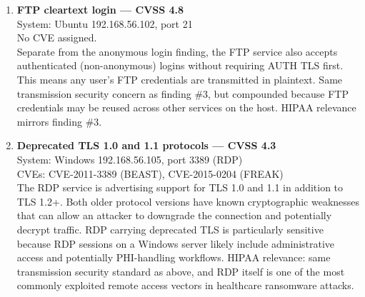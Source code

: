 \documentclass[12pt]{article}
\begin{document}
\begin{enumerate}
	\item \textbf{FTP cleartext login — CVSS 4.8}\\
		System: Ubuntu 192.168.56.102, port 21\\
		No CVE assigned.\\
		Separate from the anonymous login finding, the FTP service also accepts authenticated (non-anonymous) logins without requiring AUTH TLS first. This means any user's FTP credentials are transmitted in plaintext. Same transmission security concern as finding \#3, but compounded because FTP credentials may be reused across other services on the host. HIPAA relevance mirrors finding \#3.
	\item \textbf{Deprecated TLS 1.0 and 1.1 protocols — CVSS 4.3}\\
		System: Windows 192.168.56.105, port 3389 (RDP)\\
		CVEs: CVE-2011-3389 (BEAST), CVE-2015-0204 (FREAK)\\
		The RDP service is advertising support for TLS 1.0 and 1.1 in addition to TLS 1.2+. Both older protocol versions have known cryptographic weaknesses that can allow an attacker to downgrade the connection and potentially decrypt traffic. RDP carrying deprecated TLS is particularly sensitive because RDP sessions on a Windows server likely include administrative access and potentially PHI-handling workflows. HIPAA relevance: same transmission security standard as above, and RDP itself is one of the most commonly exploited remote access vectors in healthcare ransomware attacks.
	\end{enumerate}
\end{document}

